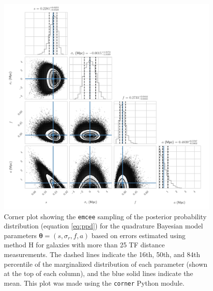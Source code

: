 \documentclass[a4paper,fleqn,usenatbib]{mnras}
\begin{document}
\begin{figure}
	\includegraphics[scale=0.69]{cornerq}
    \caption{Corner plot showing the \texttt{emcee} sampling of the posterior probability distribution (equation \ref{eq:ppd}) for the quadrature Bayesian model parameters $\pmb{\theta}=(s,\sigma_r,f,a)$ based on errors estimated using method H for galaxies with more than 25 TF distance measurements. The dashed lines indicate the 16th, 50th, and 84th percentile of the marginalized distribution of each parameter (shown at the top of each column), and the blue solid lines indicate the mean. This plot was made using the \texttt{corner} Python module.}
    \label{fig:cornerq}
\end{figure}
\end{document}
